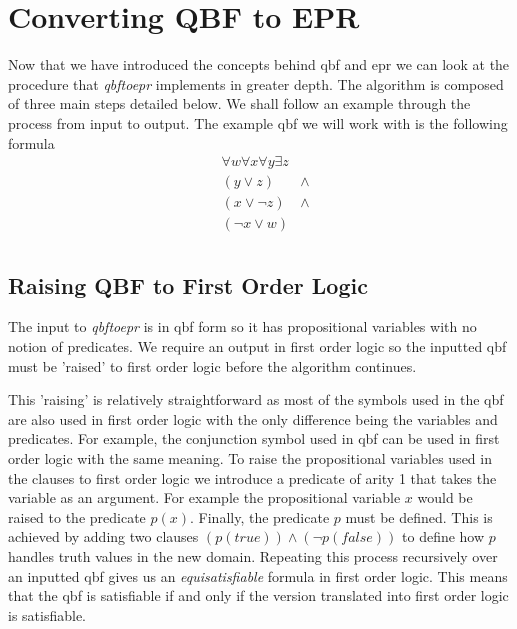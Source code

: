\chapter{Converting QBF to EPR}
Now that we have introduced the concepts behind \gls{qbf} and \gls{epr} we can look at the procedure that \textit{qbftoepr} implements in greater depth. The algorithm is composed of three main steps detailed below. We shall follow an example through the process from input to output.
The example \gls{qbf} we will work with is the following formula
\begin{equation} \label{qbf:1}
\begin{aligned}
&\forall w \forall x \forall y \exists z \\
&(y \lor z) &\land\\
&(x \lor \neg z) &\land\\
&(\neg x \lor w)\\
\end{aligned}
\end{equation}

\section{Raising QBF to First Order Logic}
The input to \textit{qbftoepr} is in \gls{qbf} form so it has propositional variables with no notion of predicates. We require an output in first order logic so the inputted \gls{qbf} must be 'raised' to first order logic before the algorithm continues.

This 'raising' is relatively straightforward as most of the symbols used in the \gls{qbf} are also used in first order logic with the only difference being the variables and predicates. For example, the conjunction symbol used in \gls{qbf} can be used in first order logic with the same meaning. To raise the propositional variables used in the clauses to first order logic we introduce a predicate of arity 1 that takes the variable as an argument. For example the propositional variable $x$ would be raised to the predicate $p(x)$. Finally, the predicate $p$ must be defined. This is achieved by adding two clauses $(p(true)) \land (\neg p(false))$ to define how $p$ handles truth values in the new domain. Repeating this process recursively over an inputted \gls{qbf} gives us an \textit{equisatisfiable} formula in first order logic. This means that the \gls{qbf} is satisfiable if and only if the version translated into first order logic is satisfiable.

